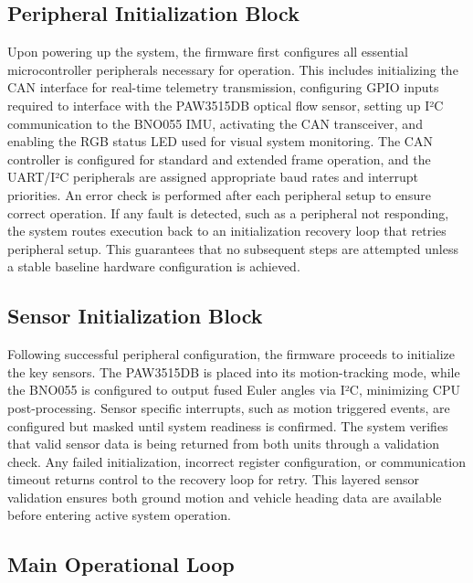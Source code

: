\documentclass[12pt]{article}
\begin{document}
        \subsection{Peripheral Initialization Block}

            Upon powering up the system, the firmware first configures all essential microcontroller peripherals necessary for operation. This includes initializing 
            the CAN interface for real-time telemetry transmission, configuring GPIO inputs required to interface with the PAW3515DB optical flow sensor, setting up 
            I²C communication to the BNO055 IMU, activating the CAN transceiver, and enabling the RGB status LED used for visual system monitoring. The CAN controller 
            is configured for standard and extended frame operation, and the UART/I²C peripherals are assigned appropriate baud rates and interrupt priorities. An error 
            check is performed after each peripheral setup to ensure correct operation. If any fault is detected, such as a peripheral not responding, the system routes 
            execution back to an initialization recovery loop that retries peripheral setup. This guarantees that no subsequent steps are attempted unless a stable baseline 
            hardware configuration is achieved.

        \subsection{Sensor Initialization Block}

            Following successful peripheral configuration, the firmware proceeds to initialize the key sensors. The PAW3515DB is placed into its motion-tracking mode, 
            while the BNO055 is configured to output fused Euler angles via I²C, minimizing CPU post-processing. Sensor specific interrupts, such as motion triggered events, 
            are configured but masked until system readiness is confirmed. The system verifies that valid sensor data is being returned from both units through a validation 
            check. Any failed initialization, incorrect register configuration, or communication timeout returns control to the recovery loop for retry. This layered sensor 
            validation ensures both ground motion and vehicle heading data are available before entering active system operation.

        \subsection{Main Operational Loop}
\end{document}
